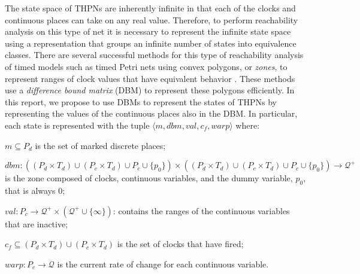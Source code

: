 \documentclass[11pt,times]{article}
\begin{document}
The state space of THPNs are inherently infinite in that each of the 
clocks and continuous places can take on any real value.  Therefore, 
to perform reachability analysis on this type of net it is necessary 
to represent the infinite state space using a representation that 
groups an infinite number of states into equivalence classes.  There 
are several successful methods for this type of reachability 
analysis of timed models such as timed Petri nets using convex 
polygons, or {\em zones}, to represent ranges of clock values that 
have equivalent behavior 
\cite{Belluomini2000,Belluomini2001,Dill:TIME,Rokicki:CAV94,Yoneda97b}.  
These methods use a
{\em difference bound matrix} (DBM) to represent these polygons 
efficiently.  In this report, we propose to use DBMs to 
represent the states of THPNs by representing the values of the 
continuous places also in the DBM.  In particular, each state is 
represented with the tuple $\langle m, dbm, val, c_f, warp \rangle$ 
where:

\begin{description}
\item $m \subseteq P_d$ is the set of marked discrete places;
\item $dbm : ((P_d \times T_d) \cup (P_c \times T_d) \cup P_c \cup
  \{p_0\}) \times ((P_d \times T_d) \cup (P_c \times T_d) \cup P_c \cup
  \{p_0\})
  \rightarrow \mathcal{Q}^+$ is the zone composed of clocks,
  continuous variables, and the dummy variable, $p_0$, that is always 0;
\item $val : P_c \rightarrow \mathcal{Q}^+ \times (\mathcal{Q}^+ \cup
  \{\infty\}) $: contains the ranges of the continuous variables that are
  inactive;
\item $c_f \subseteq (P_d \times T_d) \cup (P_c \times T_d)$ is the
  set of clocks that have fired;
\item $warp : P_c \rightarrow \mathcal{Q}$ is the current rate of change for
  each continuous variable.
\end{description}
\end{document}
